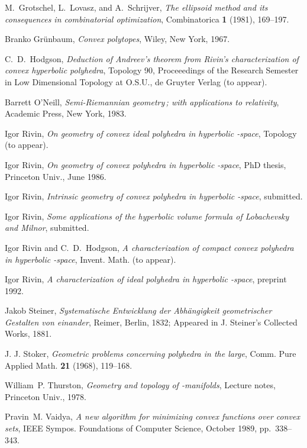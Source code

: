 \begin{thebibliography}{99}
M.~Grotschel, L.~Lovasz, and A.~Schrijver,
{\it The ellipsoid method and its consequences in 
combinatorial
  optimization\/},
Combinatorica {\bf1} (1981), 169--197.

Branko Gr{\"u}nbaum,
{\em Convex polytopes},
Wiley, New York, 1967.

{C.~D.~H}odgson,
{\it Deduction of Andreev\/\RM's 
theorem from Rivin\/\RM's characterization of convex 
hyperbolic polyhedra\/},
Topology 90, Proceeedings of the Research Semester in Low
  Dimensional Topology at O.S.U., de Gruyter Verlag (to 
appear).

Barrett O'Neill,
{\em Semi-Riemannian geometry\/\RM\,; with applications to 
relativity\/},
Academic Press, New York, 1983.

Igor Rivin,
{\it On geometry of convex ideal polyhedra in hyperbolic 
-space\/},
Topology
(to appear).

Igor Rivin,
{\em On geometry of convex polyhedra in hyperbolic 
-space\/},
PhD thesis, Princeton Univ., June 1986.

Igor Rivin,
{\it Intrinsic geometry of convex polyhedra in hyperbolic 
-space\/},
submitted.

Igor Rivin,
{\it Some applications of the hyperbolic volume formula of 
Lobachevsky and
Milnor\/}, submitted.

Igor Rivin and {C.~D.~H}odgson,
{\it A characterization of compact convex polyhedra in 
hyperbolic
-space\/},
Invent. Math. (to appear).

Igor Rivin,
{\it A characterization of ideal polyhedra in hyperbolic 
-space\/},
preprint 1992.

Jakob Steiner,
{\em Systematische Entwicklung der Abh\"{a}ngigkeit 
geometrischer
  Gestalten von einander\/},
Reimer, Berlin, 1832;
Appeared in J. Steiner's Collected Works, 1881.

J. J. Stoker,
{\it Geometric problems concerning polyhedra in the 
large\/},
Comm. Pure Applied Math. {\bf21}  (1968), 119--168.

William~P. Thurston,
{\it Geometry and topology of -{m}anifolds\/},
Lecture notes, Princeton Univ., 1978.

Pravin~M. Vaidya,
{\it A new algorithm for minimizing convex functions over 
convex sets\/},
IEEE Sympos. Foundations of Computer Science,
October 1989, pp.\ 338--343.
\end{thebibliography}

